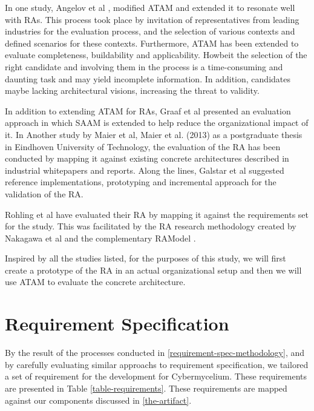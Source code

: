 \documentclass[review]{elsarticle}
\begin{document}
In one study, Angelov et al \cite{angelov2008towards}, modified ATAM and extended it to resonate well with RAs. This process took place by invitation of representatives from leading industries for the evaluation process, and the selection of various contexts and defined scenarios for these contexts. Furthermore, ATAM has been extended to evaluate completeness, buildability and applicability. Howbeit the selection of the right candidate and involving them in the process is a time-consuming and daunting task and may yield incomplete information. In addition, candidates maybe lacking architectural visions, increasing the threat to validity.

In addition to extending ATAM for RAs, Graaf et al \cite{graaf2005evaluating} presented an evaluation approach in which SAAM is extended to help reduce the organizational impact of it. In Another study by Maier et al, Maier et al. (2013) as a postgraduate thesis in Eindhoven University of Technology, the evaluation of the RA has been conducted by mapping it against existing concrete architectures described in industrial whitepapers and reports. Along the lines, Galstar et al \cite{galster2011empirically} suggested reference implementations, prototyping and incremental approach for the validation of the RA.

Rohling et al \cite{rohling2019reference} have evaluated their RA by mapping it against the requirements set for the study. This was facilitated by the RA research methodology created by Nakagawa et al \cite{Nakagawa} and the complementary RAModel \cite{nakagawa2012ramodel}.

Inspired by all the studies listed, for the purposes of this study, we will first create a prototype of the RA in an actual organizational setup and then we will use ATAM to evaluate the concrete architecture.

\section{Requirement Specification}

By the result of the processes conducted in \ref{requirement-spec-methodology}, and by carefully evaluating similar approachs to requirement specification, we tailored a set of requirement for the development for Cybermycelium.  These requirements are presented in Table \ref{table-requirements}. These requirements are mapped against our components discussed in \ref{the-artifact}.
\end{document}
